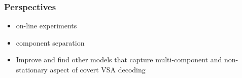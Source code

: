 \documentclass{kul-ulille-beamer}
\begin{document}
\begin{frame}
  \frametitle{Perspectives}
  \begin{itemize}

    \item on-line experiments
    \item component separation
    \item Improve and find other models that capture multi-component and
      non-stationary aspect of covert VSA decoding

  \end{itemize}
\end{frame}

%

%
%
%
%
\end{document}
